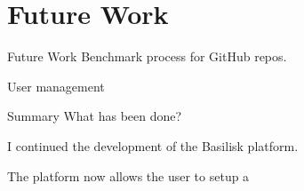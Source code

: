 \section{Future Work}
\begin{frame}{Future Work}
	Benchmark process for GitHub repos.
	
	User management
\end{frame}

\begin{frame}{Summary}
	What has been done?
	
	I continued the development of the Basilisk platform.
	
	The platform now allows the user to setup a 
\end{frame}